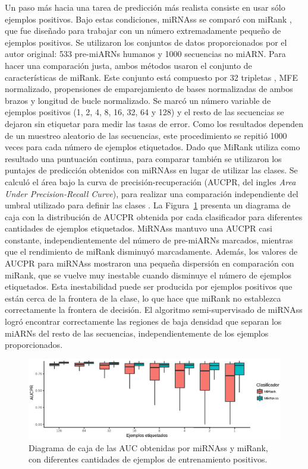 Un paso más hacia una tarea de predicción más realista consiste en usar sólo ejemplos positivos. Bajo estas condiciones, miRNAss se comparó con miRank
\citep{xu2008microrna}, que fue diseñado para trabajar con un número extremadamente pequeño de ejemplos positivos. Se utilizaron los conjuntos de datos
proporcionados por el autor original: 533 pre-miARNs humanos y 1000 secuencias no miARN. Para hacer una comparación justa, ambos métodos usaron el conjunto de
características de miRank. Este conjunto está compuesto por 32 tripletas \citep{xue2005classification}, MFE normalizado, propensiones de emparejamiento de bases
normalizadas de ambos brazos y longitud de bucle normalizado. Se marcó un número variable de ejemplos positivos (1, 2, 4, 8, 16, 32, 64 y 128) y el resto de las
secuencias se dejaron sin etiquetar para medir las tasas de error. Como los resultados dependen de un muestreo aleatorio de las secuencias, este procedimiento
se repitió 1000 veces para cada número de ejemplos etiquetados. Dado que MiRank utiliza como resultado una puntuación continua, para comparar también se
utilizaron los puntajes de predicción obtenidos con miRNAss en lugar de utilizar las clases. Se calculó el área bajo la curva de precisión-recuperación (AUCPR,
del ingles \textit{Area Under Precision-Recall Curve}), para realizar una comparación independiente del umbral utilizado para definir las clases
\citep{bradley1997use}.
La Figura~\ref{fig:miRank} presenta un diagrama de caja con la distribución de AUCPR obtenida por cada clasificador para diferentes cantidades de ejemplos
etiquetados. MiRNAss mantuvo una AUCPR casi constante, independientemente del número de pre-miARNs marcados, mientras que el rendimiento de miRank disminuyó
marcadamente. Además, los valores de AUCPR para miRNAss mostraron una pequeña dispersión en comparación con miRank, que se vuelve muy inestable cuando disminuye
el número de ejemplos etiquetados. Esta inestabilidad puede ser producida por ejemplos positivos que están cerca de la frontera de la clase, lo que hace que
miRank no establezca correctamente la frontera de decisión. El algoritmo semi-supervisado de miRNAss logró encontrar correctamente las regiones de baja densidad
que separan los miARNs del resto de las secuencias, independientemente de los ejemplos proporcionados.

\begin{figure}[tpb]
	\centering
	\includegraphics[width=\linewidth]{fig/few_samples_miRank.eps}
	\caption[$AUC$ con pocos ejemplos positivos]{Diagrama de caja de las AUC obtenidas por miRNAss y miRank, con diferentes cantidades de ejemplos de entrenamiento positivos.}
	\label{fig:miRank}
\end{figure}

